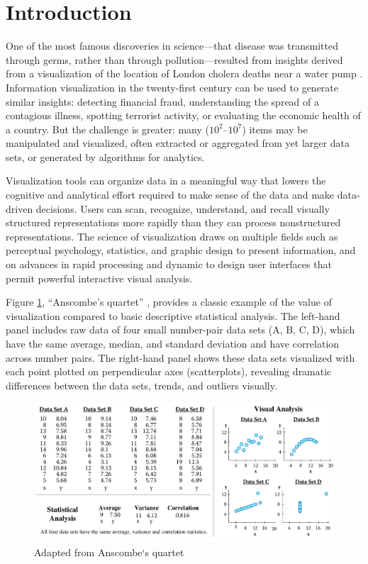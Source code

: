 \documentclass[]{krantz}
\begin{document}
\section{Introduction}\label{sec:viz-1}

One of the most famous discoveries in science---that disease was
transmitted through germs, rather than through pollution---resulted from
insights derived from a visualization of the location of London cholera
deaths near a water pump \citep{snow1855mode}. Information visualization
in the twenty-first century can be used to generate similar insights:
detecting financial fraud, understanding the spread of a contagious
illness, spotting terrorist activity, or evaluating the economic health
of a country. But the challenge is greater: many
(\(10^{2}\)--\(10^{7}\)) items may be manipulated and visualized, often
extracted or aggregated from yet larger data sets, or generated by
algorithms for analytics.

Visualization tools can organize data in a meaningful way that lowers
the cognitive and analytical effort required to make sense of the data
and make data-driven decisions. Users can scan, recognize, understand,
and recall visually structured representations more rapidly than they
can process nonstructured representations. The science of visualization
draws on multiple fields such as perceptual psychology, statistics, and
graphic design to present information, and on advances in rapid
processing and dynamic to design user interfaces that permit powerful
interactive visual analysis.

Figure \ref{fig:fig9-1}, ``Anscombe's quartet''
\citep{anscombe1973graphs}, provides a classic example of the value of
visualization compared to basic descriptive statistical analysis. The
left-hand panel includes raw data of four small number-pair data sets
(A, B, C, D), which have the same average, median, and standard
deviation and have correlation across number pairs. The right-hand panel
shows these data sets visualized with each point plotted on
perpendicular axes (scatterplots), revealing dramatic differences
between the data sets, trends, and outliers visually.

\begin{figure}

{\centering \includegraphics[width=0.9\linewidth]{ChapterViz/figures/fig9-1-new} 

}

\caption{Adapted from Anscombe`s quartet \citep{anscombe1973graphs}}\label{fig:fig9-1}
\end{figure}
\end{document}
